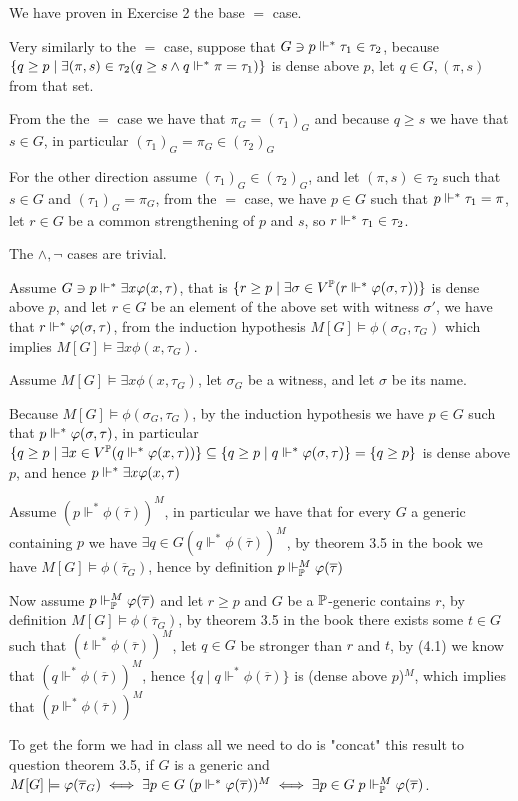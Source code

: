 \begin{cExercise}
	We have proven in Exercise 2 the base $=$ case.
	
	Very similarly to the $=$ case, suppose that $G\ni p\force^*\tau_1\in\tau_2$, because $\{q\ge p\mid \exists(\pi,s)\in\tau_2(q\ge s\land q\force^*\pi=\tau_1)\}$ is dense above $p$, let $q\in G,(\pi,s)$ from that set.
	
	From the the $=$ case we have that $\pi_G=(\tau_1)_G$ and because $q\ge s$ we have that $s\in G$, in particular $(\tau_1)_G=\pi_G\in (\tau_2)_G$
	
	For the other direction assume $(\tau_1)_G\in (\tau_2)_G$, and let $(\pi,s)\in\tau_2$ such that $s\in G$ and $(\tau_1)_G=\pi_G$, from the $=$ case, we have $p\in G$ such that $p\force^* \tau_1=\pi$, let $r\in G$ be a common strengthening of $p$ and $s$, so $r\force^*\tau_1\in\tau_2$.
	
	The $\land,\lnot$ cases are trivial.
	
	Assume $G\ni p\force^*\exists x\phi(x,\tau)$, that is $\{r\ge p\mid\exists \sigma\in V^\P(r\force^*\phi(\sigma,\tau))\}$ is dense above $p$, and let $r\in G$ be an element of the above set with witness $\sigma'$, we have that $r\force^*\phi(\sigma,\tau)$, from the induction hypothesis $M[G]\models \phi(\sigma_G,\tau_G)$ which implies $M[G]\models \exists x\phi(x,\tau_G)$.
	
	Assume $M[G]\models \exists x\phi(x,\tau_G)$, let $\sigma_G$ be a witness, and let $\sigma$ be its name.
	
	Because $M[G]\models \phi(\sigma_G,\tau_G)$, by the induction hypothesis we have $p\in G$ such that $p\force^*\phi(\sigma,\tau)$, in particular $\{q\ge p\mid \exists x\in V^\P(q\force^*\phi(x,\tau))\}\subseteq\{q\ge p\mid q\force^*\phi(\sigma,\tau)\}=\{q\ge p\}$ is dense above $p$, and hence $p\force^*\exists x\phi(x,\tau)$
\end{cExercise}
\begin{cExercise}[][][author][6]
	Assume $(p\Vdash^*\phi(\overline\tau))^M$, in particular we have that for every $G$ a generic containing $p$ we have $\exists q\in G (q\Vdash^* \phi(\overline{\tau}))^M$, by theorem 3.5 in the book we have $M[G]\models \phi(\overline{\tau}_G)$, hence by definition $p\Vdash_\Bbb P^M \phi(\overline{\tau})$
	
	Now assume $p\Vdash_\Bbb P^M \phi(\overline{\tau})$ and let $r\ge p$ and $G$ be a $\Bbb P$-generic contains $r$, by definition $M[G]\models \phi(\overline{\tau}_G)$, by theorem 3.5 in the book there exists some $t\in G$ such that $(t\Vdash^*\phi(\overline\tau))^M$, let $q\in G$ be stronger than $r$ and $t$, by (4.1) we know that $(q\Vdash^*\phi(\overline\tau))^M$, hence $\{q\mid q\Vdash^*\phi(\overline\tau)\}$ is (dense above $p$)$^M$, which implies that $(p\Vdash^*\phi(\overline\tau))^M$
	
	To get the form we had in class all we need to do is "concat" this result to question theorem 3.5, if $G$ is a generic and $M[G]\models \phi(\overline{\tau}_G)\iff \exists p\in G\; (p\force^*\phi(\overline{\tau}))^M\iff \exists p\in G\; p\force_\P^M \phi(\overline{\tau})$.
\end{cExercise}

